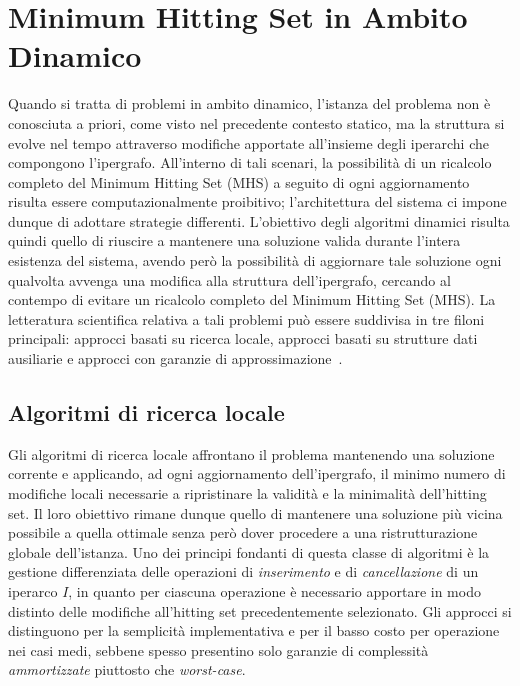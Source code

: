 
\section{Minimum Hitting Set in Ambito Dinamico}\label{sec:minimum_hitting_set_in_ambito_dinamico}

Quando si tratta di problemi in ambito dinamico, l'istanza del problema non è conosciuta a priori, come visto nel precedente contesto statico, ma la struttura si evolve nel tempo attraverso modifiche apportate all'insieme degli iperarchi che compongono l'ipergrafo.
All'interno di tali scenari, la possibilità di un ricalcolo completo del Minimum Hitting Set (MHS) a seguito di ogni aggiornamento risulta essere computazionalmente proibitivo; l'architettura del sistema ci impone dunque di adottare strategie differenti.
L'obiettivo degli algoritmi dinamici risulta quindi quello di riuscire a mantenere una soluzione valida durante l'intera esistenza del sistema, avendo però la possibilità di aggiornare tale soluzione ogni qualvolta avvenga una modifica alla struttura dell'ipergrafo, cercando al contempo di evitare un ricalcolo completo del Minimum Hitting Set (MHS).
La letteratura scientifica relativa a tali problemi può essere suddivisa in tre filoni principali: approcci basati su ricerca locale, approcci basati su strutture dati ausiliarie e approcci con garanzie di approssimazione~\cite{agarwal2020}.

\subsection*{Algoritmi di ricerca locale}

Gli algoritmi di ricerca locale affrontano il problema mantenendo una soluzione corrente e applicando, ad ogni aggiornamento dell'ipergrafo, il minimo numero di modifiche locali necessarie a ripristinare la validità e la minimalità dell'hitting set.
Il loro obiettivo rimane dunque quello di mantenere una soluzione più vicina possibile a quella ottimale senza però dover procedere a una ristrutturazione globale dell'istanza.
Uno dei principi fondanti di questa classe di algoritmi è la gestione differenziata delle operazioni di \textit{inserimento} e di \textit{cancellazione} di un iperarco $I$, in quanto per ciascuna operazione è necessario apportare in modo distinto delle modifiche all'hitting set precedentemente selezionato.
Gli approcci si distinguono per la semplicità implementativa e per il basso costo per operazione nei casi medi, sebbene spesso presentino solo garanzie di complessità \textit{ammortizzate} piuttosto che \textit{worst-case}.

